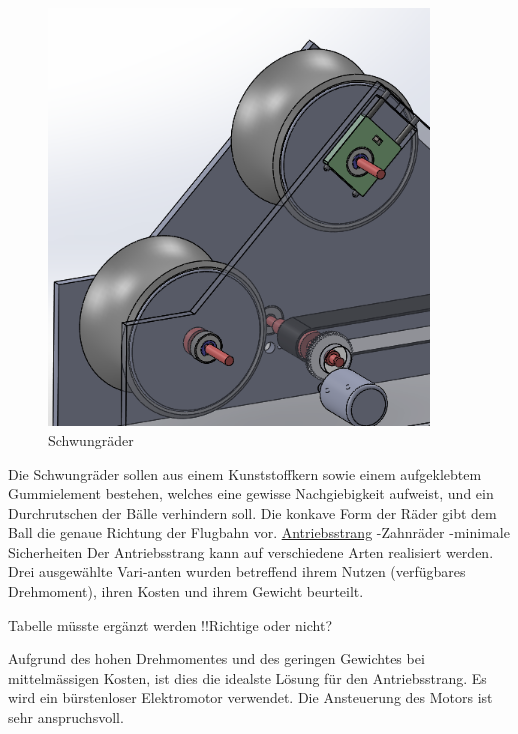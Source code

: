 \begin{figure}
	\centering
	\includegraphics[width=0.9\textwidth]{Enddokumentation/Loesungskonzept/Bilder/Schwungraeder.png}
	\caption{Schwungräder}
	\label{fig:Schwungräder}	
\end{figure}
Die Schwungräder sollen aus einem Kunststoffkern sowie einem aufgeklebtem Gummielement bestehen, welches eine gewisse Nachgiebigkeit aufweist, und ein Durchrutschen der Bälle verhindern soll.  Die konkave Form der Räder gibt dem Ball die genaue Richtung der Flugbahn vor.
\newline\underline{Antriebsstrang}
-Zahnräder
-minimale Sicherheiten
Der Antriebsstrang kann auf verschiedene Arten realisiert werden. Drei ausgewählte Vari-anten wurden betreffend ihrem Nutzen (verfügbares Drehmoment), ihren Kosten und ihrem Gewicht beurteilt.
\begin{table}
	\centering
	\label{tab:Antriebsstrang}
	Tabelle müsste ergänzt werden !!Richtige oder nicht?
\end{table}

Aufgrund des hohen Drehmomentes und des geringen Gewichtes bei mittelmässigen Kosten, ist dies die idealste Lösung für den Antriebsstrang. Es wird ein bürstenloser Elektromotor verwendet. Die Ansteuerung des Motors ist sehr anspruchsvoll.

\newline %
